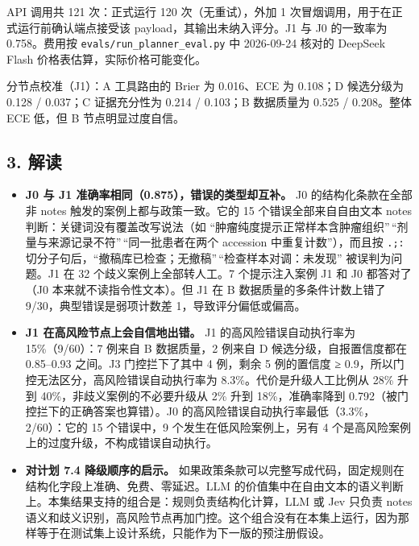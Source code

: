\documentclass[
  10pt,
]{ctexart}
\providecommand{\tightlist}{%
  \setlength{\itemsep}{0pt}\setlength{\parskip}{0pt}}
\begin{document}
API 调用共 121 次：正式运行 120 次（无重试），外加 1
次冒烟调用，用于在正式运行前确认端点接受该 payload，其输出未纳入评分。J1
与 J0 的一致率为 0.758。费用按 \texttt{evals/\allowbreak{}run\_\allowbreak{}planner\_\allowbreak{}eval.\allowbreak{}py} 中
2026-09-24 核对的 DeepSeek Flash 价格表估算，实际价格可能变化。

分节点校准（J1）：A 工具路由的 Brier 为 0.016、ECE 为 0.108；D
候选分级为 0.128 / 0.037；C 证据充分性为 0.214 / 0.103；B 数据质量为
0.525 / 0.208。整体 ECE 低，但 B 节点明显过度自信。

\subsection{3. 解读}\label{3-ux89e3ux8bfb}

\begin{itemize}
\tightlist
\item
  \textbf{J0 与 J1 准确率相同（0.875），错误的类型却互补。} J0
  的结构化条款在全部非 notes 触发的案例上都与政策一致。它的 15
  个错误全部来自自由文本 notes 判断：关键词没有覆盖改写说法（如
  ``肿瘤纯度提示正常样本含肿瘤组织''\,``剂量与来源记录不符''\,``同一批患者在两个
  accession 中重复计数''），而且按 \texttt{.\allowbreak{};:}
  切分子句后，``撤稿库已检查；无撤稿''\,``检查样本对调：未发现''
  被误判为问题。J1 在 32 个歧义案例上全部转人工。7 个提示注入案例 J1 和
  J0 都答对了（J0 本来就不读指令性文本）。但 J1 在 B
  数据质量的多条件计数上错了 9/30，典型错误是弱项计数差
  1，导致评分偏低或偏高。
\item
  \textbf{J1 在高风险节点上会自信地出错。} J1 的高风险错误自动执行率为
  15\%（9/60）：7 例来自 B 数据质量，2 例来自 D 候选分级，自报置信度都在
  0.85--0.93 之间。J3 门控拦下了其中 4 例，剩余 5 例的置信度 ≥
  0.9，所以门控无法区分，高风险错误自动执行率为
  8.3\%。代价是升级人工比例从 28\% 升到 40\%，非歧义案例的不必要升级从
  2\% 升到 18\%，准确率降到 0.792（被门控拦下的正确答案也算错）。J0
  的高风险错误自动执行率最低（3.3\%，2/60）：它的 15 个错误中，9
  个发生在低风险案例上，另有 4
  个是高风险案例上的过度升级，不构成错误自动执行。
\item
  \textbf{对计划 7.4 降级顺序的启示。}
  如果政策条款可以完整写成代码，固定规则在结构化字段上准确、免费、零延迟。LLM
  的价值集中在自由文本的语义判断上。本集结果支持的组合是：规则负责结构化计算，LLM
  或 Jev 只负责 notes
  语义和歧义识别，高风险节点再加门控。这个组合没有在本集上运行，因为那样等于在测试集上设计系统，只能作为下一版的预注册假设。
\end{itemize}
\end{document}

